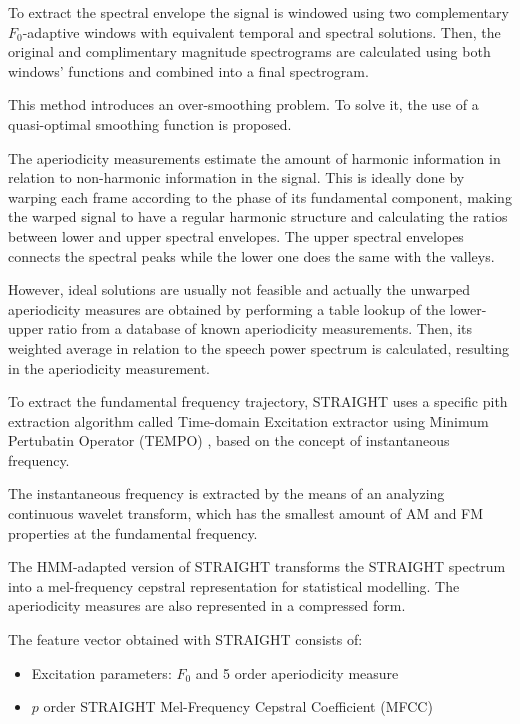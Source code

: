 To extract the spectral envelope the signal is windowed using two complementary $F_{0}$-adaptive windows with equivalent temporal and spectral solutions.
%
Then, the original and complimentary magnitude spectrograms are calculated using both windows' functions and combined into a final spectrogram.

This method introduces an over-smoothing problem.
% 
To solve it, the use of a quasi-optimal smoothing function is proposed.

The aperiodicity measurements estimate the amount of harmonic information in relation to non-harmonic information in the signal.
%
This is ideally done by warping each frame according to the phase of its fundamental component, making the warped signal to have a regular harmonic structure and calculating the ratios between lower and upper spectral envelopes.
%
The upper spectral envelopes connects the spectral peaks while the lower one does the same with the valleys.

However, ideal solutions are usually not feasible and actually the unwarped aperiodicity measures are obtained by performing a table lookup of the lower-upper ratio from a database of known aperiodicity measurements.
%
Then, its weighted average in relation to the speech power spectrum is calculated, resulting in the aperiodicity measurement.

To extract the fundamental frequency trajectory, STRAIGHT uses a specific pith extraction algorithm called Time-domain Excitation extractor using Minimum Pertubatin Operator (TEMPO) \cite{kawahara1999restructuring}, based on the concept of instantaneous frequency.

The instantaneous frequency is extracted by the means of an analyzing continuous wavelet transform, which has the smallest amount of AM and FM properties at the fundamental frequency.

The HMM-adapted version of STRAIGHT transforms the STRAIGHT spectrum into a mel-frequency cepstral representation for statistical modelling.
%
The aperiodicity measures are also represented in a compressed form.

The feature vector obtained with STRAIGHT consists of:

\begin{itemize}
	\item Excitation parameters: $F_{0}$ and 5 order aperiodicity measure
	\item $p$ order STRAIGHT Mel-Frequency Cepstral Coefficient (MFCC)
\end{itemize}

